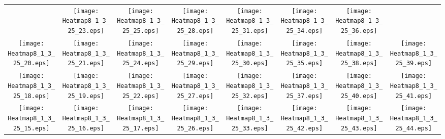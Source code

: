 \documentclass{standalone}
\begin{document}
\renewcommand{\arraystretch}{0}
\setlength{\tabcolsep}{0pt}
\begin{tabular}{ *8{c} }
 & \texttt{[image: Heatmap8\_1\_3\_25\_23.eps]} & \texttt{[image: Heatmap8\_1\_3\_25\_25.eps]} & \texttt{[image: Heatmap8\_1\_3\_25\_28.eps]} & \texttt{[image: Heatmap8\_1\_3\_25\_31.eps]} & \texttt{[image: Heatmap8\_1\_3\_25\_34.eps]} & \texttt{[image: Heatmap8\_1\_3\_25\_36.eps]} &  \\
\texttt{[image: Heatmap8\_1\_3\_25\_20.eps]} & \texttt{[image: Heatmap8\_1\_3\_25\_21.eps]} & \texttt{[image: Heatmap8\_1\_3\_25\_24.eps]} & \texttt{[image: Heatmap8\_1\_3\_25\_29.eps]} & \texttt{[image: Heatmap8\_1\_3\_25\_30.eps]} & \texttt{[image: Heatmap8\_1\_3\_25\_35.eps]} & \texttt{[image: Heatmap8\_1\_3\_25\_38.eps]} & \texttt{[image: Heatmap8\_1\_3\_25\_39.eps]} \\
\texttt{[image: Heatmap8\_1\_3\_25\_18.eps]} & \texttt{[image: Heatmap8\_1\_3\_25\_19.eps]} & \texttt{[image: Heatmap8\_1\_3\_25\_22.eps]} & \texttt{[image: Heatmap8\_1\_3\_25\_27.eps]} & \texttt{[image: Heatmap8\_1\_3\_25\_32.eps]} & \texttt{[image: Heatmap8\_1\_3\_25\_37.eps]} & \texttt{[image: Heatmap8\_1\_3\_25\_40.eps]} & \texttt{[image: Heatmap8\_1\_3\_25\_41.eps]} \\
\texttt{[image: Heatmap8\_1\_3\_25\_15.eps]} & \texttt{[image: Heatmap8\_1\_3\_25\_16.eps]} & \texttt{[image: Heatmap8\_1\_3\_25\_17.eps]} & \texttt{[image: Heatmap8\_1\_3\_25\_26.eps]} & \texttt{[image: Heatmap8\_1\_3\_25\_33.eps]} & \texttt{[image: Heatmap8\_1\_3\_25\_42.eps]} & \texttt{[image: Heatmap8\_1\_3\_25\_43.eps]} & \texttt{[image: Heatmap8\_1\_3\_25\_44.eps]} \\

\end{tabular}
\end{document}
